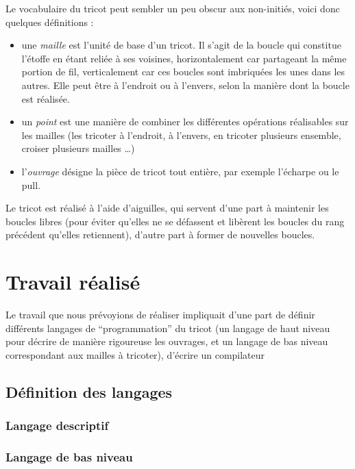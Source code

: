 \documentclass{article}
\begin{document}
Le vocabulaire du tricot peut sembler un peu obscur aux non-initiés, voici donc quelques définitions :

\begin{itemize}
\item une \emph{maille} est l'unité de base d'un tricot. Il s'agit de la boucle qui constitue l'étoffe en étant reliée à ses voisines, horizontalement car 
  partageant la même portion de fil, verticalement car ces boucles sont imbriquées les unes dans les autres. Elle peut être à l'endroit ou à l'envers, selon la 
  manière dont la boucle est réalisée.
\item un \emph{point} est une manière de combiner les différentes opérations réalisables sur les mailles (les tricoter à l'endroit, à l'envers, en tricoter 
  plusieurs ensemble, croiser plusieurs mailles \dots)
\item l'\emph{ouvrage} désigne la pièce de tricot tout entière, par exemple l'écharpe ou le pull.
\end{itemize}

Le tricot est réalisé à l'aide d'aiguilles, qui servent d'une part à maintenir les boucles libres (pour éviter qu'elles ne se défassent et libèrent les boucles du 
rang précédent qu'elles retiennent), d'autre part à former de nouvelles boucles.

\newpage

\section{Travail réalisé}

Le travail que nous prévoyions de réaliser impliquait d'une part de définir différents langages de ``programmation'' du tricot (un langage de haut niveau pour 
décrire de manière rigoureuse les ouvrages, et un langage de bas niveau correspondant aux mailles à tricoter), d'écrire un compilateur

\subsection{Définition des langages}

\subsubsection{Langage descriptif}

\subsubsection{Langage de bas niveau}
\end{document}
